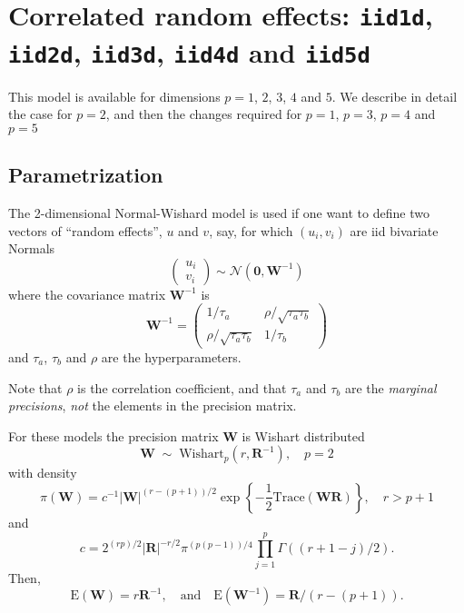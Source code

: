 \documentclass[a4paper,11pt]{article}
\begin{document}
\section*{Correlated random effects: \texttt{iid1d}, \texttt{iid2d},
    \texttt{iid3d}, \texttt{iid4d} and \texttt{iid5d}}

This model is available for dimensions $p=1$, $2$, $3$, $4$ and
$5$. We describe in detail the case for $p=2$, and then the changes
required for $p=1$, $p=3$, $p=4$ and $p=5$

\subsection*{Parametrization}

The 2-dimensional Normal-Wishard model is used if one want to define
two vectors of ``random effects'', $u$ and $v$, say, for which
$(u_{i}, v_{i})$ are iid bivariate Normals
\begin{displaymath}
    \left(
      \begin{array}{c}
          u_{i}\\
          v_{i}
      \end{array}\right)
    \sim \mathcal{N}\left(\mathbf{0}, \mathbf{W}^{-1}\right)
\end{displaymath}
where the  covariance matrix $\mathbf{W}^{-1}$ is
\begin{equation}
    \label{precision}
    \mathbf{W}^{-1} = \left(\begin{array}{cc}
          1/\tau_a & \rho /\sqrt{\tau_a\tau_b}\\
          \rho/\sqrt{\tau_a\tau_b}&  1/\tau_b
      \end{array}\right)
\end{equation}
and $\tau_{a}$, $\tau_{b}$ and $\rho$ are the hyperparameters.

Note that $\rho$ is the correlation coefficient, and that $\tau_{a}$
and $\tau_{b}$ are the \emph{marginal precisions}, \emph{not} the
elements in the precision matrix.

For these models the precision matrix $\mathbf{W}$ is Wishart
distributed
\begin{displaymath}
    \mathbf{W}
    \;\sim\;\text{Wishart}_{p}(r, \mathbf{R}^{-1}), \quad p=2
\end{displaymath}
with density
\begin{displaymath}
    \pi(\mathbf{W}) = c^{-1} |\mathbf{W}|^{(r-(p+1))/2} \exp\left\{
      -\frac{1}{2}\text{Trace}(\mathbf{W}\mathbf{R})\right\}, \quad r > p+1
\end{displaymath}
and
\begin{displaymath}
    c = 2^{(rp)/2} |\mathbf{R}|^{-r/2} \pi^{(p(p-1))/4}\prod_{j=1}^{p}
    \Gamma((r+1-j)/2).
\end{displaymath}
Then,
\begin{displaymath}
    \text{E}(\mathbf{W}) = r\mathbf{R}^{-1}, \quad\text{and}\quad
    \text{E}(\mathbf{W}^{-1}) = \mathbf{R}/(r-(p+1)).
\end{displaymath}
\end{document}
